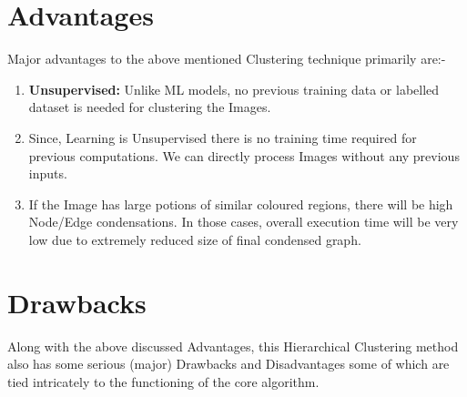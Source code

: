     \section{Advantages}
        Major advantages to the above mentioned Clustering technique primarily are:-
        \begin{enumerate}
            \item {
                \textbf{Unsupervised:} Unlike ML models, no previous training data or labelled dataset is needed for clustering the Images.
            }
            \item {
                Since, Learning is Unsupervised there is no training time required for previous computations. We can directly process Images without any previous inputs.   
            }
            \item {
                If the Image has large potions of similar coloured regions, there will be high Node/Edge condensations. In those cases, overall execution time will be very low due to extremely reduced size of final condensed graph.
            }
        \end{enumerate}

    \section{Drawbacks}
        Along with the above discussed Advantages, this Hierarchical Clustering method also has some serious (major) Drawbacks and Disadvantages some of which are tied intricately to the functioning of the core algorithm.

